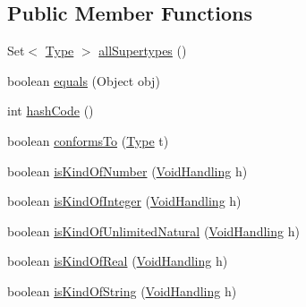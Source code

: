 \subsection*{Public Member Functions}
\begin{DoxyCompactItemize}
\item 
Set$<$ \hyperlink{interfaceorg_1_1tzi_1_1use_1_1uml_1_1ocl_1_1type_1_1_type}{Type} $>$ \hyperlink{classorg_1_1tzi_1_1use_1_1uml_1_1ocl_1_1type_1_1_void_type_a4ec436b5b1c6ae27c63c7f5dc072bc71}{all\-Supertypes} ()
\item 
boolean \hyperlink{classorg_1_1tzi_1_1use_1_1uml_1_1ocl_1_1type_1_1_void_type_a467bfee64a617a1a67c5957c1c003a32}{equals} (Object obj)
\item 
int \hyperlink{classorg_1_1tzi_1_1use_1_1uml_1_1ocl_1_1type_1_1_void_type_a2a59cfcc52fcdc5048b45cd0707862b0}{hash\-Code} ()
\item 
boolean \hyperlink{classorg_1_1tzi_1_1use_1_1uml_1_1ocl_1_1type_1_1_void_type_afcac2f990fb6d76dfc7867498c5736dc}{conforms\-To} (\hyperlink{interfaceorg_1_1tzi_1_1use_1_1uml_1_1ocl_1_1type_1_1_type}{Type} t)
\item 
boolean \hyperlink{classorg_1_1tzi_1_1use_1_1uml_1_1ocl_1_1type_1_1_void_type_a125c411b516aedf62e8eb256ba1fa842}{is\-Kind\-Of\-Number} (\hyperlink{enumorg_1_1tzi_1_1use_1_1uml_1_1ocl_1_1type_1_1_type_1_1_void_handling}{Void\-Handling} h)
\item 
boolean \hyperlink{classorg_1_1tzi_1_1use_1_1uml_1_1ocl_1_1type_1_1_void_type_a0a99c75e5812029421ec4c4b81c19763}{is\-Kind\-Of\-Integer} (\hyperlink{enumorg_1_1tzi_1_1use_1_1uml_1_1ocl_1_1type_1_1_type_1_1_void_handling}{Void\-Handling} h)
\item 
boolean \hyperlink{classorg_1_1tzi_1_1use_1_1uml_1_1ocl_1_1type_1_1_void_type_afc86d477ad5cae53a274e4cfa1855532}{is\-Kind\-Of\-Unlimited\-Natural} (\hyperlink{enumorg_1_1tzi_1_1use_1_1uml_1_1ocl_1_1type_1_1_type_1_1_void_handling}{Void\-Handling} h)
\item 
boolean \hyperlink{classorg_1_1tzi_1_1use_1_1uml_1_1ocl_1_1type_1_1_void_type_ab2861a22665b4ca8191e136494ea4157}{is\-Kind\-Of\-Real} (\hyperlink{enumorg_1_1tzi_1_1use_1_1uml_1_1ocl_1_1type_1_1_type_1_1_void_handling}{Void\-Handling} h)
\item 
boolean \hyperlink{classorg_1_1tzi_1_1use_1_1uml_1_1ocl_1_1type_1_1_void_type_aec2f3a2db532ba200e82b122cb21d0f5}{is\-Kind\-Of\-String} (\hyperlink{enumorg_1_1tzi_1_1use_1_1uml_1_1ocl_1_1type_1_1_type_1_1_void_handling}{Void\-Handling} h)
\item 

\end{DoxyCompactItemize}
